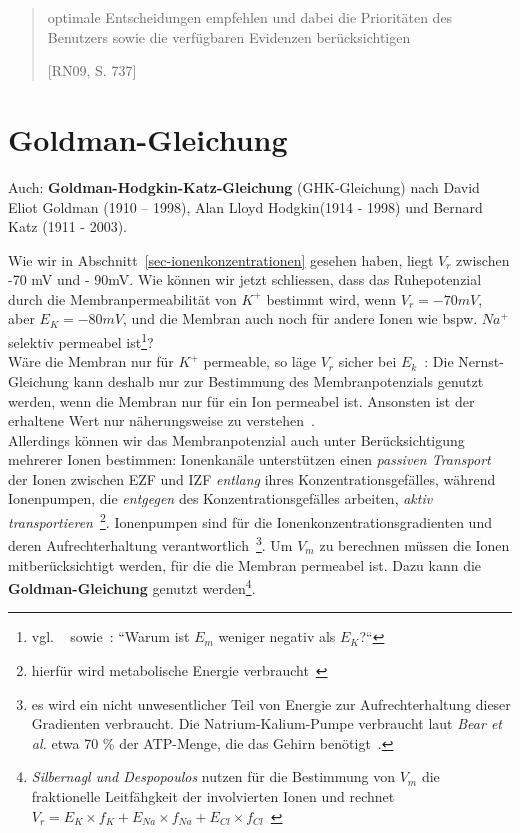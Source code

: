{\blockquote[{[RN09, S. 737]}]{
    optimale Entscheidungen empfehlen und dabei die Prioritäten des Benutzers sowie die verfügbaren Evidenzen berücksichtigen
}


\section{Goldman-Gleichung}\label{appendix:goldman}

Auch: \textbf{Goldman-Hodgkin-Katz-Gleichung} (GHK-Gleichung) nach David Eliot Goldman (1910 – 1998), Alan Lloyd Hodgkin(1914 - 1998) und Bernard Katz (1911 - 2003).

Wie wir in Abschnitt~\ref{sec-ionenkonzentrationen} gesehen haben, liegt $V_r$ zwischen -70 mV und - 90mV. Wie können wir jetzt schliessen, dass das Ruhepotenzial durch die Membranpermeabilität von $K^+$ bestimmt wird, wenn $V_r = -70 mV$, aber $E_K = -80 mV$, und die Membran auch noch für andere Ionen wie bspw. $Na^+$ selektiv permeabel ist\footnote{
    vgl. ~\cite[77]{BCP18} sowie~\cite[44]{SD07}: ``Warum ist $E_m$ weniger negativ als $E_K${?}``
}? \\
Wäre die Membran nur für $K^+$ permeable, so läge $V_r$ sicher bei $E_k$~\cite[32]{SD07}: Die Nernst-Gleichung kann deshalb nur zur Bestimmung des Membranpotenzials genutzt werden, wenn die Membran nur für ein Ion permeabel ist. Ansonsten ist der erhaltene Wert nur näherungsweise zu verstehen~\cite[67]{FE19}.\\

Allerdings können wir das Membranpotenzial auch unter Berücksichtigung mehrerer Ionen bestimmen: Ionenkanäle unterstützen einen \textit{passiven Transport} der Ionen zwischen EZF und IZF \textit{entlang} ihres Konzentrationsgefälles, während Ionenpumpen, die \textit{entgegen} des Konzentrationsgefälles arbeiten, \textit{aktiv transportieren}~\cite[30]{Fro19}\footnote{
    hierfür wird metabolische Energie verbraucht~\cite[31]{Fro19}
}.
Ionenpumpen sind für die Ionenkonzentrationsgradienten und deren Aufrechterhaltung verantwortlich~\cite[76]{BCP18}\footnote{
    es wird ein nicht unwesentlicher Teil von Energie zur Aufrechterhaltung dieser Gradienten verbraucht. Die Natrium-Kalium-Pumpe verbraucht laut \textit{Bear et al.} etwa 70 \% der ATP-Menge, die das Gehirn benötigt~\cite[76]{BCP18}.
}.
Um $V_m$ zu berechnen müssen die Ionen mitberücksichtigt werden, für die die Membran permeabel ist.
Dazu kann die \textbf{Goldman-Gleichung} genutzt werden\footnote{
    \textit{Silbernagl und Despopoulos} nutzen für die Bestimmung von $V_m$ die fraktionelle Leitfähgkeit der involvierten Ionen und rechnet $V_r = E_K \times f_K + E_{Na}  \times f_{Na} + E_{Cl}  \times f_{Cl}$~\cite[32, 1.21]{SD07}
}.

}
